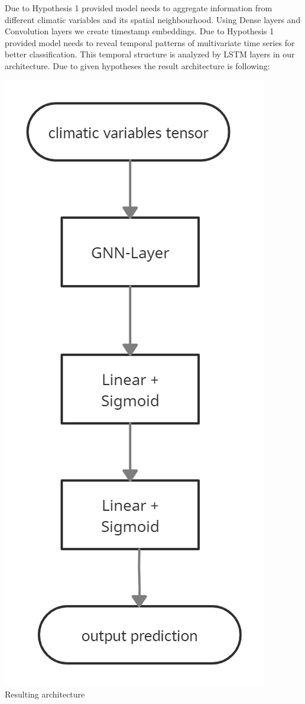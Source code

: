 \documentclass{article}
\begin{document}
Due to Hypothesis 1 provided model needs to aggregate information from different climatic variables and its spatial neighbourhood. Using Dense layers and Convolution layers we create timestamp embeddings. Due to Hypothesis 1 provided model needs to reveal temporal patterns of multivariate time series for better classification. This temporal structure is analyzed by LSTM layers in our architecture. Due to given hypotheses the result architecture is following:
\begin{center}
    \includegraphics[scale=0.19]{figures/HailNet architecture.png} \\ Resulting architecture
\end{center}
\end{document}

